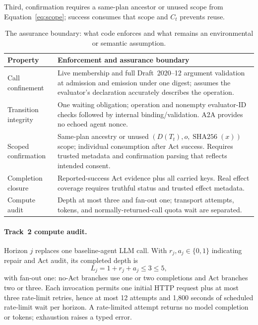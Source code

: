 \documentclass{article}
\begin{document}
Third, confirmation requires a same-plan ancestor or unused scope from
Equation~\ref{eq:scope}; success consumes that scope and $C_t$ prevents reuse.

\begin{table}[t]
\centering
\footnotesize
\setlength{\tabcolsep}{3pt}
\begin{tabular}{@{}L{.22\columnwidth}L{.70\columnwidth}@{}}
\toprule
Property & Enforcement and assurance boundary\\
\midrule
Call confinement &
Live membership and full Draft~2020--12 argument validation at admission and
emission under one digest; assumes the evaluator's declaration accurately
describes the operation.\\
Transition integrity &
One waiting obligation; operation and nonempty evaluator-ID checks followed by
internal binding/validation.  A2A provides no echoed agent nonce.\\
Scoped confirmation &
Same-plan ancestry or unused $(D(T_t),o,\operatorname{SHA256}(x))$ scope;
individual consumption after Act success.  Requires trusted metadata and
confirmation parsing that reflects intended consent.\\
Completion closure &
Reported-success Act evidence plus all carried keys.  Real effect coverage
requires truthful status and trusted effect metadata.\\
Compute audit &
Depth at most three and fan-out one; transport attempts, tokens, and
normally-returned-call quota wait are separated.\\
\bottomrule
\end{tabular}
\caption{The assurance boundary: what code enforces and what remains an
environmental or semantic assumption.}
\label{tab:guarantees}
\end{table}

\paragraph{Track~2 compute audit.}
Horizon $j$ replaces one baseline-agent LLM call.  With
$r_j,a_j\in\{0,1\}$ indicating repair and Act audit, its completed depth is
\begin{equation}
 L_j=1+r_j+a_j\leq3\leq5,
 \label{eq:calls}
\end{equation}
with fan-out one: no-Act branches use one or two completions and Act branches
two or three.  Each invocation permits one initial HTTP request plus at most
three rate-limit retries, hence at most 12 attempts and 1,800 seconds of
scheduled rate-limit wait per horizon.  A rate-limited attempt returns no model
completion or tokens; exhaustion raises a typed error.
\end{document}
